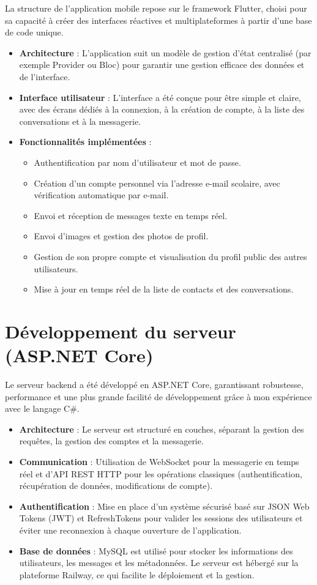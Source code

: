 \documentclass[12pt]{report}
\begin{document}
La structure de l'application mobile repose sur le framework Flutter, choisi pour sa capacité à créer des interfaces réactives et multiplateformes à partir d'une base de code unique.

\begin{itemize}
	\item \textbf{Architecture} : L'application suit un modèle de gestion d'état centralisé (par exemple Provider ou Bloc) pour garantir une gestion efficace des données et de l'interface.
	\item \textbf{Interface utilisateur} : L'interface a été conçue pour être simple et claire, avec des écrans dédiés à la connexion, à la création de compte, à la liste des conversations et à la messagerie.
	\item \textbf{Fonctionnalités implémentées} :
	\begin{itemize}
		\item Authentification par nom d'utilisateur et mot de passe.
		\item Création d'un compte personnel via l'adresse e-mail scolaire, avec vérification automatique par e-mail.
		\item Envoi et réception de messages texte en temps réel.
		\item Envoi d'images et gestion des photos de profil.
		\item Gestion de son propre compte et visualisation du profil public des autres utilisateurs.
		\item Mise à jour en temps réel de la liste de contacts et des conversations.
	\end{itemize}
\end{itemize}

\section{Développement du serveur (ASP.NET Core)}

Le serveur backend a été développé en ASP.NET Core, garantissant robustesse, performance et une plus grande facilité de développement grâce à mon expérience avec le langage C\#.

\begin{itemize}
	\item \textbf{Architecture} : Le serveur est structuré en couches, séparant la gestion des requêtes, la gestion des comptes et la messagerie.
	\item \textbf{Communication} : Utilisation de WebSocket pour la messagerie en temps réel et d'API REST HTTP pour les opérations classiques (authentification, récupération de données, modifications de compte).
	\item \textbf{Authentification} : Mise en place d'un système sécurisé basé sur JSON Web Tokens (JWT) et RefreshTokens pour valider les sessions des utilisateurs et éviter une reconnexion à chaque ouverture de l'application.
	\item \textbf{Base de données} : MySQL est utilisé pour stocker les informations des utilisateurs, les messages et les métadonnées. Le serveur est hébergé sur la plateforme Railway, ce qui facilite le déploiement et la gestion.
\end{itemize}
\end{document}

